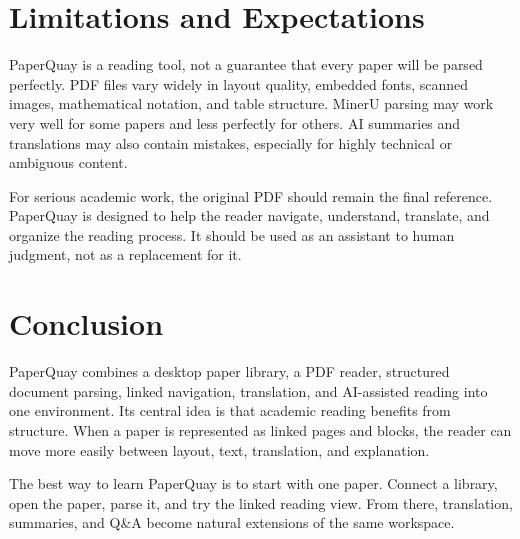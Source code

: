 ﻿\documentclass[11pt,a4paper]{article}
\begin{document}
\section{Limitations and Expectations}

PaperQuay is a reading tool, not a guarantee that every paper will be parsed perfectly. PDF files vary widely in layout quality, embedded fonts, scanned images, mathematical notation, and table structure. MinerU parsing may work very well for some papers and less perfectly for others. AI summaries and translations may also contain mistakes, especially for highly technical or ambiguous content.

For serious academic work, the original PDF should remain the final reference. PaperQuay is designed to help the reader navigate, understand, translate, and organize the reading process. It should be used as an assistant to human judgment, not as a replacement for it.

\section{Conclusion}

PaperQuay combines a desktop paper library, a PDF reader, structured document parsing, linked navigation, translation, and AI-assisted reading into one environment. Its central idea is that academic reading benefits from structure. When a paper is represented as linked pages and blocks, the reader can move more easily between layout, text, translation, and explanation.

The best way to learn PaperQuay is to start with one paper. Connect a library, open the paper, parse it, and try the linked reading view. From there, translation, summaries, and Q\&A become natural extensions of the same workspace.
\end{document}
